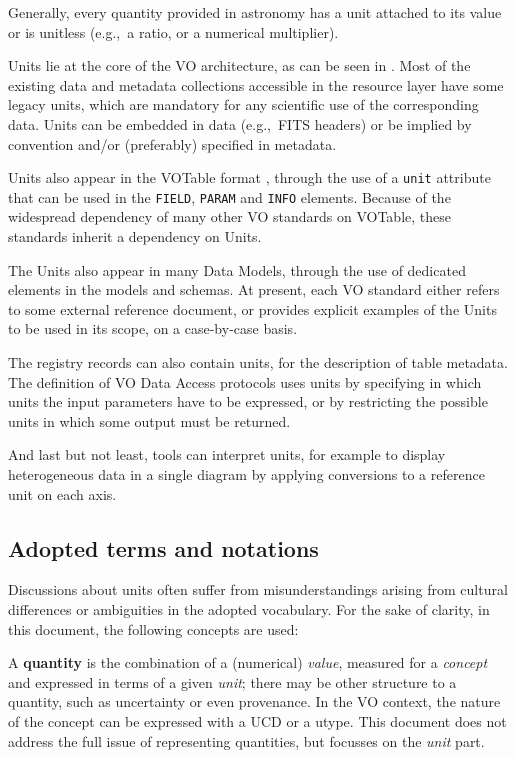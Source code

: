 \documentclass[11pt,notitlepage,onecolumn]{ivoa}
\def\eg{e.g.,~}
\begin{document}
Generally, every quantity provided in astronomy has a unit attached to
its value or is unitless (\eg a ratio, or a numerical multiplier).  

Units lie at the core of the VO architecture, as can be seen in .
Most of the existing data and metadata collections accessible in the resource
layer have some legacy units, which are mandatory for any scientific use of
the corresponding data.  Units can be embedded in data (\eg FITS headers) or be
implied by convention and/or (preferably) specified in metadata.

Units also appear in the VOTable format \citep{ochsenbein11}, through the use
of a {\tt unit} attribute that can be used in the {\tt FIELD}, {\tt PARAM} and {\tt INFO} 
elements. Because of the widespread dependency of many other VO standards on VOTable,
these standards inherit a dependency on Units.

The Units also appear in many Data Models, through the use of dedicated elements in
the models and schemas.
At present, each VO standard either refers to some external reference document, or 
provides explicit examples of the Units to be used in its scope, on a case-by-case
basis.

The registry records can also contain units, for the description of table metadata.
The definition of VO Data Access protocols uses units by specifying in which units the input
parameters have to be expressed, or by restricting the possible units in which some 
output must be returned.

And last but not least, tools can interpret units, for example to display
heterogeneous data in a single diagram by applying conversions to a reference 
unit on each axis.

\subsection{Adopted terms and notations\label{sec:notations}}

Discussions about units often suffer from misunderstandings arising from cultural
differences or ambiguities in the adopted vocabulary. For the sake of clarity, in this 
document, the following concepts are used:

A \textbf{quantity} is the combination of a (numerical) {\em
value}, measured for a {\em concept} and expressed in terms of a given
{\em unit}; there may be other structure to a quantity, such as
uncertainty or even provenance. 
In the VO context, the nature of the concept can be expressed with a UCD or a utype. This document does not address the full issue of
representing quantities, but focusses on the {\em unit} part.
\end{document}
